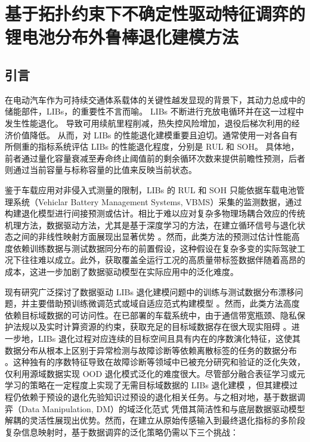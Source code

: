 \chapter{基于拓扑约束下不确定性驱动特征调弈的锂电池分布外鲁棒退化建模方法}\label{chap:RODTNet}

\section{引言}\label{sec:RODTNet_introduction}

在电动汽车作为可持续交通体系载体的关键性越发显现的背景下，其动力总成中的储能部件，LIBs，的重要性不言而喻\cite{10766661, 9849057, 10897846, WASEEM2025236414}。
LIBs 不断进行充放电循环并在这一过程中发生性能退化。
导致可用续航里程削减，热失控风险增加，退役后梯次利用的经济价值降低\cite{LI2024155588}。
从而，对 LIBs 的性能退化建模重要且迫切。通常使用一对各自有所侧重的指标系统评估 LIBs 的性能退化程度，分别是 RUL 和 SOH。
具体地，前者通过量化容量衰减至寿命终止阈值前的剩余循环次数来提供前瞻性预测，后者则通过当前容量与标称容量的比值来反映当前状态。

鉴于车载应用对非侵入式测量的限制，LIBs 的 RUL 和 SOH 只能依据车载电池管理系统（Vehiclar Battery Management Systems, VBMS）采集的监测数据，通过构建退化模型进行间接预测或估计。相比于难以应对复杂多物理场耦合效应的传统机理方法，数据驱动方法，尤其是基于深度学习的方法，在建立循环信号与退化状态之间的非线性映射方面展现出显著优势 \cite{XIAO2023107347, XIE2024630}。然而，此类方法的预测过估计性能高度依赖训练数据与测试数据同分布的前置假设，这种假设在复杂多变的实际驾驶工况下往往难以成立。此外，获取覆盖全运行工况的高质量带标签数据伴随着高昂的成本，这进一步加剧了数据驱动模型在实际应用中的泛化难度。

现有研究广泛探讨了数据驱动 LIBs 退化建模问题中的训练与测试数据分布漂移问题，并主要借助预训练微调范式或域自适应范式构建模型 \cite{10177255}。然而，此类方法高度依赖目标域数据的可访问性。在已部署的车载系统中，由于通信带宽瓶颈、隐私保护法规以及实时计算资源的约束，获取充足的目标域数据存在很大现实阻碍 \cite{10886998, 10663939, 9849057}。进一步地，LIBs 退化过程对应连续的目标空间且具有内在的序数演化特征，这使其数据分布从根本上区别于异常检测与故障诊断等依赖离散标签的任务的数据分布 \cite{10214203, 10577994}。这种独有的序数特征导致在故障诊断等领域中已被充分研究和验证的泛化失效，仅利用源域数据实现 OOD 退化模式泛化的难度很大。尽管部分融合表征学习或元学习的策略在一定程度上实现了无需目标域数据的 LIBs 退化建模 \cite{TAN2024103725, CHEN2024234696}，但其建模过程仍依赖于预设的退化先验知识过预设的退化相关任务。与之相对地，基于数据调弈（Data Manipulation, DM）的域泛化范式 \cite{9782500} 凭借其简洁性和与底层数据驱动模型解耦的灵活性展现出优势。然而，在建立从原始传感输入到最终退化指标的多阶段复杂信息映射时，基于数据调弈的泛化策略仍需以下三个挑战：

